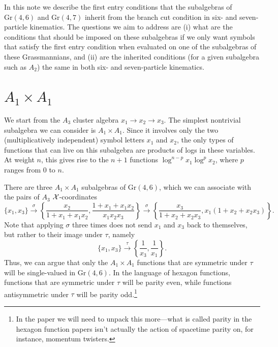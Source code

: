 \documentclass[12pt]{article}
\begin{document}
\thispagestyle{fancyplain}
 
\fancyhf{}
 
\cfoot{\fancyplain{}{\thepage}}


\noindent In this note we describe the first entry conditions that the subalgebras of $\text{Gr}(4,6)$ and $\text{Gr}(4,7)$ inherit from the branch cut condition in six- and seven-particle kinematics. The questions we aim to address are (i) what are the conditions that should be imposed on these subalgebras if we only want symbols that satisfy the first entry condition when evaluated on one of the subalgebras of these Grassmannians, and (ii) are the inherited conditions (for a given subalgebra such as $A_2$) the same in both six- and seven-particle kinematics. 

\section*{$A_1 \times A_1$}
We start from the $A_3$ cluster algebra $x_1 \to x_2 \to x_3$. The simplest nontrivial subalgebra we can consider is $A_1 \times A_1$. Since it involves only the two (multiplicatively independent) symbol letters $x_1$ and $x_2$, the only types of functions that can live on this subalgebra are products of logs in these variables. At weight $n$, this gives rise to the $n+1$ functions $\log^{n-p} x_1 \log^{p} x_2$, where $p$ ranges from 0 to $n$. 

There are three $A_1 \times A_1$ subalgebras of $\text{Gr}(4,6)$, which we can associate with the pairs of $A_3$ ${\cal X}$-coordinates 
$$\{ x_1, x_3 \} \xrightarrow{\sigma} \left \{ \frac{x_2}{1 + x_1 + x_1 x_2}, \frac{1 + x_1 + x_1 x_2}{x_1 x_2 x_3} \right \} \xrightarrow{\sigma} \left \{ \frac{x_3}{1 + x_2 + x_2 x_3}, x_1 (1 + x_2 + x_2 x_3) \right \}. $$
Note that applying $\sigma$ three times does not send $x_1$ and $x_3$ back to themselves, but rather to their image under $\tau$, namely 
$$\{ x_1, x_3 \} \xrightarrow{\tau} \left \{ \frac{1}{x_3}, \frac{1}{x_1} \right \}. $$
Thus, we can argue that only the $A_1 \times A_1$ functions that are symmetric under $\tau$ will be single-valued in $\text{Gr}(4,6)$. In the language of hexagon functions, functions that are symmetric under $\tau$ will be parity even, while functions antisymmetric under $\tau$ will be parity odd.\footnote{In the paper we will need to unpack this more---what is called parity in the hexagon function papers isn't actually the action of spacetime parity on, for instance, momentum twisters.}
\end{document}
